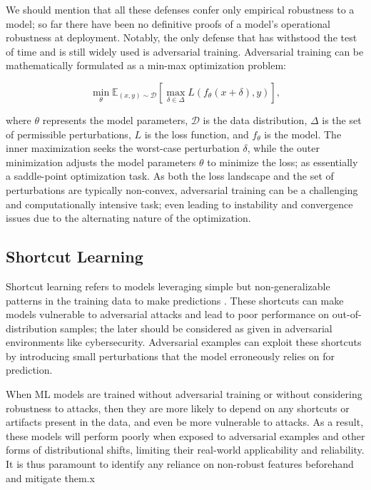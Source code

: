 We should mention that all these defenses confer only empirical robustness to a model; so far there have been no definitive proofs of a model's operational robustness at deployment.
Notably, the only defense that has withstood the test of time and is still widely used is adversarial training.
Adversarial training can be mathematically formulated as a min-max optimization problem:

\begin{equation}
\min_{\theta} \mathbb{E}_{(x,y) \sim \mathcal{D}} \left[ \max_{\delta \in \Delta} L(f_\theta(x + \delta), y) \right],
\end{equation}

where \( \theta \) represents the model parameters, \( \mathcal{D} \) is the data distribution, \( \Delta \) is the set of permissible perturbations, \( L \) is the loss function, and \( f_\theta \) is the model.
The inner maximization seeks the worst-case perturbation \( \delta \), while the outer minimization adjusts the model parameters \( \theta \) to minimize the loss; as essentially a saddle-point optimization task.
As both the loss landscape and the set of perturbations are typically non-convex, adversarial training can be a challenging and computationally intensive task; even leading to instability and convergence issues due to the alternating nature of the optimization.

\subsection{Shortcut Learning}

Shortcut learning refers to models leveraging simple but non-generalizable patterns in the training data to make predictions \cite{geirhos2020shortcut}.
These shortcuts can  make models vulnerable to adversarial attacks and lead to poor performance on out-of-distribution samples; the later should be considered as given in adversarial environments like cybersecurity.
Adversarial examples can exploit these shortcuts by introducing small perturbations that the model erroneously relies on for prediction.

When \gls{ML} models are trained without adversarial training or without considering robustness to attacks, then they are more likely to depend on any shortcuts or artifacts present in the data, and even be more vulnerable to attacks.
As a result, these models will perform poorly when exposed to adversarial examples and other forms of distributional shifts, limiting their real-world applicability and reliability.
It is thus paramount to identify any reliance on non-robust features beforehand and mitigate them.x

